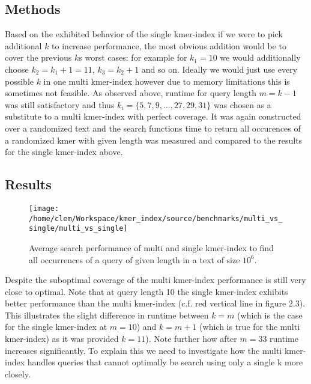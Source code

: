 \subsection{Methods}
Based on the exhibited behavior of the single kmer-index if we were to pick additional
$k$ to increase performance, the most obvious addition would be to cover the previous $k$s
worst cases: for example for $k_{1}=10$ we would additionally
choose $k_{2}=k_{1}+1=11$, $k_{3}=k_{2}+1$ and so on. Ideally we would
just use every possible $k$ in one multi kmer-index however due to memory limitations
this is sometimes not feasible. As observed above, runtime for query length $m=k-1$
was still satisfactory and thus $k_{i}=\{5,7,9,...,27,29,31\}$ was
chosen as a substitute to a multi kmer-index with perfect coverage. It was again constructed
over a randomized text and the search functions time to return all occurences of a randomized kmer with
given length was measured and compared to the results for the single kmer-index above.

\subsection{Results}
\begin{figure}[H]
\texttt{[image: /home/clem/Workspace/kmer\_index/source/benchmarks/multi\_vs\_single/multi\_vs\_single]}
\label{single_vs_multi}
\caption{Average search performance of multi and single kmer-index to find
all occurrences of a query of given length in a text of size $10^{6}$.}
\end{figure}

Despite the suboptimal coverage of the multi kmer-index performance is still very close to optimal. Note that at query
length 10 the single kmer-index exhibits better performance than the multi kmer-index (c.f. red vertical line in figure 2.3).
This illustrates the slight difference in runtime between $k=m$ (which is the case for the single kmer-index
at $m=10$) and $k=m+1$ (which is true for the multi kmer-index) as it was provided $k=11$).
Note further how after $m=33$ runtime increases significantly. To explain this we need to investigate how the
multi kmer-index handles queries that cannot optimally be search using only a single k more closely.

